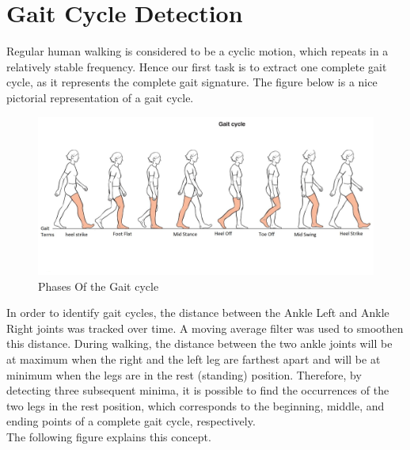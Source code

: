 \section{Gait Cycle Detection} \label{Gait Cycle Detection} 

\noindent Regular human walking is considered to be a cyclic motion, which repeats in a relatively stable frequency. Hence our first task is to extract one complete gait cycle, as it represents the complete gait signature. The figure below is a nice pictorial representation of a gait cycle.

\begin{figure}[h]
\centering
\includegraphics[scale=0.2]{gaitoriginal.jpg}
\caption{Phases Of the Gait cycle}
\end{figure}

\noindent In order to identify gait cycles, the distance between the Ankle Left and Ankle Right joints was tracked over time. A moving average filter was used to smoothen this distance. During walking, the distance between the two ankle joints will be at maximum when the right and the left leg are farthest apart and will be at minimum when the legs are in the rest (standing) position. Therefore, by detecting three subsequent minima, it is possible to find the occurrences of the two legs in the rest position, which corresponds to the beginning, middle, and ending points of a complete gait cycle, respectively. \\                                         The following figure explains this concept.

